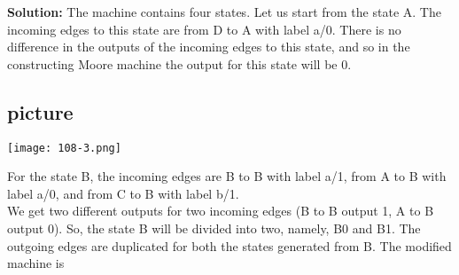 \documentclass[8pt]{beamer}
\begin{document}
\begin{frame}
\textbf{Solution:} The machine contains four states. Let us start from the state A. The incoming
edges to this state are from D to A with label a/0. There is no difference in the outputs of the
incoming edges to this state, and so in the constructing Moore machine the output for this
state will be 0.\\

\vspace*{0.1cm}
\begin{center}
\section{picture}
\texttt{[image: 108-3.png]}
\end{center}

\small{
For the state B, the incoming edges are B to B with label a/1, from A to B with label a/0, and from
C to B with label b/1.\\
\hspace*{0.5cm} We get two different outputs for two incoming edges (B to B output 1, A to B output 0). So, the
state B will be divided into two, namely, B0 and B1. The outgoing edges are duplicated for both
the states generated from B. The modified machine is}\\
\end{frame}
\end{document}
